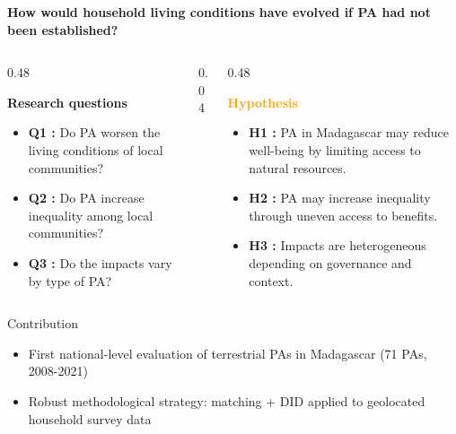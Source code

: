\documentclass[
  ignorenonframetext,
  aspectratio=169,
]{beamer}
\begin{document}
\begin{frame}{\textbf{How would household living conditions have evolved
if PA had not been established?}}
\protect{}\label{how-would-household-living-conditions-have-evolved-if-pa-had-not-been-established}
\begin{columns}[T]

\begin{column}{0.48\linewidth}

\textcolor{vertfonce}{\textbf{Research questions}}

\small
\begin{itemize}
\item \textbf{Q1 :} Do PA worsen the living conditions of local communities?
\item \textbf{Q2 :} Do PA increase inequality among local communities?
\item \textbf{Q3 :} Do the impacts vary by type of PA?
\end{itemize}

\end{column}

\begin{column}{0.04\linewidth}
\end{column}

\begin{column}{0.48\linewidth}

\textcolor{orange}{\textbf{Hypothesis}}

\small
\begin{itemize}
\item \textbf{H1 :} PA in Madagascar may reduce well-being by limiting access to natural resources.
\item \textbf{H2 :} PA may increase inequality through uneven access to benefits.
\item \textbf{H3 :} Impacts are heterogeneous depending on governance and context.
\end{itemize}

\end{column}

\end{columns}
\end{frame}

\begin{frame}{Contribution}
\protect{}\label{contribution}
\begin{itemize}
\item
  First national-level evaluation of terrestrial PAs in Madagascar (71
  PAs, 2008-2021)
\item
  Robust methodological strategy: matching + DID applied to geolocated
  household survey data
\end{itemize}
\end{frame}
\end{document}
